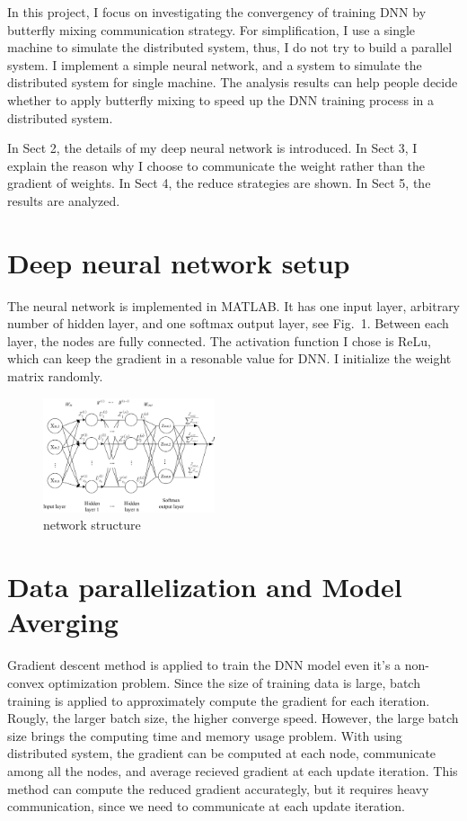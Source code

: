 \documentclass{article}
\begin{document}
In this project, I focus on investigating the convergency of training DNN by butterfly mixing communication strategy. For simplification, I use a single machine to simulate the distributed system, thus, I do not try to build a parallel system. I implement a simple neural network, and a system to simulate the distributed system for single machine. The analysis results can help people decide whether to apply butterfly mixing to speed up the DNN training process in a distributed system.

In Sect 2, the details of my deep neural network is introduced. In Sect 3, I explain the reason why I choose to communicate the weight rather than the gradient of weights. In Sect 4, the reduce strategies are shown. In Sect 5, the results are analyzed.  

\section{Deep neural network setup}

The neural network is implemented in MATLAB. It has one input layer, arbitrary number of hidden layer, and one softmax output layer, see Fig.~1. Between each layer, the nodes are fully connected. The activation function I chose is ReLu, which can keep the gradient in a resonable value for DNN. I initialize the weight matrix randomly.

\begin{figure}[h!]

  \centering
    \includegraphics[width=0.45\textwidth]{cs289_6.jpg}
  \caption{network structure}
\end{figure}

\section{Data parallelization and Model Averging}
Gradient descent method is applied to train the DNN model even it's a non-convex optimization problem. Since the size of training data is large, batch training is applied to approximately compute the gradient for each iteration. Rougly, the larger batch size, the higher converge speed. However, the large batch size brings the computing time and memory usage problem. With using distributed system, the gradient can be computed at each node, communicate among all the nodes, and average recieved gradient at each update iteration. This method can compute the reduced gradient accurategly, but it requires heavy communication, since we need to communicate at each update iteration. \\
\end{document}
